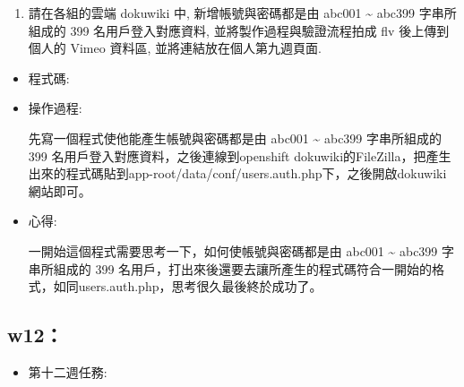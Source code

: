 \documentclass[]{article}
\newenvironment{Shaded}{}{}
\newcommand{\KeywordTok}[1]{\textcolor[rgb]{0.00,0.44,0.13}{\textbf{{#1}}}}
\newcommand{\DataTypeTok}[1]{\textcolor[rgb]{0.56,0.13,0.00}{{#1}}}
\newcommand{\DecValTok}[1]{\textcolor[rgb]{0.25,0.63,0.44}{{#1}}}
\newcommand{\CharTok}[1]{\textcolor[rgb]{0.25,0.44,0.63}{{#1}}}
\newcommand{\StringTok}[1]{\textcolor[rgb]{0.25,0.44,0.63}{{#1}}}
\newcommand{\CommentTok}[1]{\textcolor[rgb]{0.38,0.63,0.69}{\textit{{#1}}}}
\newcommand{\OtherTok}[1]{\textcolor[rgb]{0.00,0.44,0.13}{{#1}}}
\newcommand{\NormalTok}[1]{{#1}}
\begin{document}
\begin{enumerate}
\def\labelenumi{\arabic{enumi}.}
\setcounter{enumi}{2}
\itemsep1pt\parskip0pt
\item
  請在各組的雲端 dokuwiki 中, 新增帳號與密碼都是由 abc001
  \textasciitilde{} abc399 字串所組成的 399 名用戶登入對應資料,
  並將製作過程與驗證流程拍成 flv 後上傳到個人的 Vimeo 資料區,
  並將連結放在個人第九週頁面.
\end{enumerate}

\begin{itemize}
\item
  程式碼:

\begin{Shaded}
\end{Shaded}
\item
  操作過程:

  先寫一個程式使他能產生帳號與密碼都是由 abc001 \textasciitilde{} abc399
  字串所組成的 399 名用戶登入對應資料，之後連線到openshift
  dokuwiki的FileZilla，把產生出來的程式碼貼到app-root/data/conf/users.auth.php下，之後開啟dokuwiki網站即可。
\item
  心得:

  一開始這個程式需要思考一下，如何使帳號與密碼都是由 abc001
  \textasciitilde{} abc399 字串所組成的 399
  名用戶，打出來後還要去讓所產生的程式碼符合一開始的格式，如同users.auth.php，思考很久最後終於成功了。
\end{itemize}

\subsection{w12：}\label{w12}

\begin{itemize}
\itemsep1pt\parskip0pt
\item
  第十二週任務:
\end{itemize}
\end{document}
